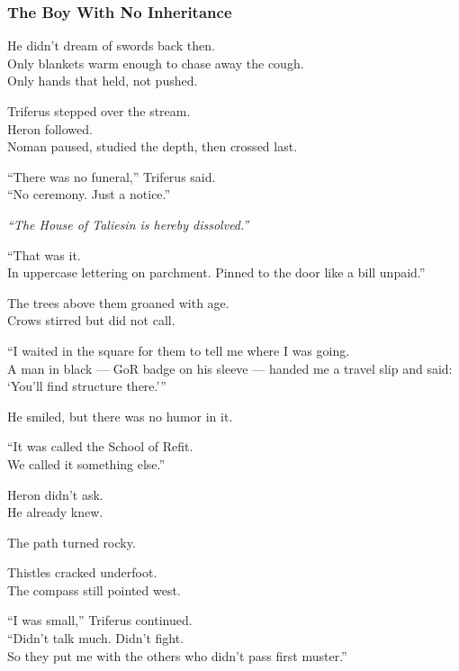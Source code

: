 \documentclass[12pt]{article}
\begin{document}
\dotfill


\subsubsection{The Boy With No Inheritance}

He didn’t dream of swords back then.\\
Only blankets warm enough to chase away the cough.\\
Only hands that held, not pushed.

\vspace{1em}

Triferus stepped over the stream.\\
Heron followed.\\
Noman paused, studied the depth, then crossed last.

“There was no funeral,” Triferus said.\\
“No ceremony. Just a notice.”

\textit{“The House of Taliesin is hereby dissolved.”}

“That was it.\\
In uppercase lettering on parchment. Pinned to the door like a bill unpaid.”

\vspace{1em}

The trees above them groaned with age.\\
Crows stirred but did not call.

“I waited in the square for them to tell me where I was going.\\
A man in black — GoR badge on his sleeve — handed me a travel slip and said: ‘You’ll find structure there.’”

He smiled, but there was no humor in it.

“It was called the School of Refit.\\
We called it something else.”

Heron didn’t ask.\\
He already knew.

\vspace{1em}

The path turned rocky.

Thistles cracked underfoot.\\
The compass still pointed west.

“I was small,” Triferus continued.\\
“Didn’t talk much. Didn’t fight.\\
So they put me with the others who didn’t pass first muster.”
\end{document}
